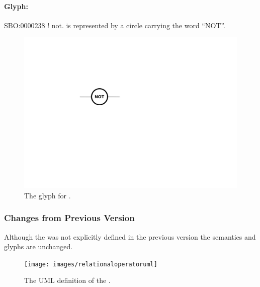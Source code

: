 \paragraph{Glyph: }\label{sec:techref:not}

\begin{glyphDescription}
 \glyphSboTerm SBO:0000238 ! not.
 \glyphNode {} is represented by a circle carrying the word ``NOT''.
 \end{glyphDescription}

\begin{figure}[htb]
  \centering
  \includegraphics[scale = 0.5]{images/not}
  \caption{The \PD glyph for .}
  \label{fig:techref:not}
\end{figure}

\subsubsection{Changes from Previous Version}

Although the  was not explicitly defined in
the previous version the semantics and glyphs are unchanged.








\label{sec:techref:relation}
\label{defn:RelationalOperator}

\begin{figure}[htb]
  \centering
  \texttt{[image: images/relationaloperatoruml]}
  \caption{The UML definition of the .}
  \label{fig:techref:relationaloperatoruml}
\end{figure}


